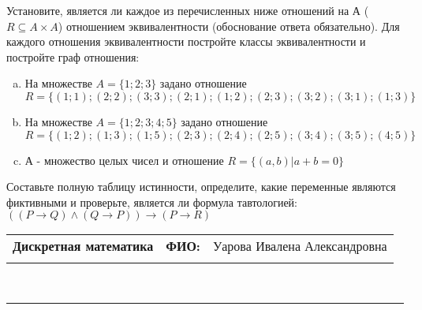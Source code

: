 \documentclass[10pt]{exam}
\newcommand{\class}{Дискретная математика}
\newcommand{\examdate}{}
\begin{document}
\begin{questions}
\question
Установите, является ли каждое из перечисленных ниже отношений на А ($R \subseteq A \times A$) отношением эквивалентности (обоснование ответа обязательно). Для каждого отношения эквивалентности постройте классы 
эквивалентности и постройте граф отношения:
\begin{enumerate} [a)]\setcounter{enumi}{0}
\item На множестве $A = \{1; 2; 3\}$ задано отношение $R = \{(1; 1); (2; 2); (3; 3); (2; 1); (1; 2); (2; 3); (3; 2); (3; 1); (1; 3)\}$
\item На множестве $A = \{1; 2; 3; 4; 5\}$ задано отношение $R = \{(1; 2); (1; 3); (1; 5); (2; 3); (2; 4); (2; 5); (3; 4); (3; 5); (4; 5)\}$
\item А - множество целых чисел и отношение $R = \{(a,b)|a + b = 0\}$
\end{enumerate}\question Составьте полную таблицу истинности, определите, какие переменные являются фиктивными и проверьте, является ли формула тавтологией:
$(( P \rightarrow Q) \land (Q \rightarrow P)) \rightarrow (P \rightarrow R)$

\end{questions}
\newpage
\begin{flushright}
\begin{tabular}{p{2.8in} r l}
\textbf{\class} & \textbf{ФИО:} &Уарова Ивалена Александровна
\\

\textbf{\examdate} &&\\
\end{tabular}\\
\end{flushright}
\rule[1ex]{\textwidth}{.1pt}
\end{document}
